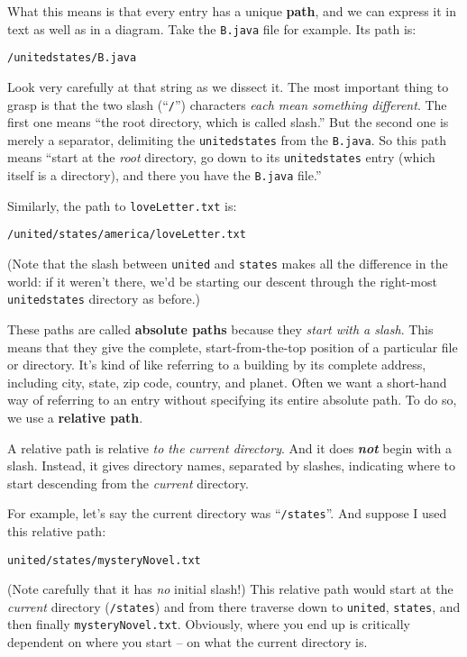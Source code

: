 What this means is that every entry has a unique \textbf{path}, and we can
express it in text as well as in a diagram. Take the \texttt{B.java} file for
example. Its path is:

\quad\quad \texttt{/unitedstates/B.java}

Look very carefully at that string as we dissect it. The most important thing
to grasp is that the two slash (``\texttt{/}'') characters \textit{each mean
something different}. The first one means ``the root directory, which is called
slash.'' But the second one is merely a separator, delimiting the
\texttt{unitedstates} from the \texttt{B.java}. So this path means
``start at the \textit{root} directory, go down to its \texttt{unitedstates}
entry (which itself is a directory), and there you have the \texttt{B.java}
file.''

Similarly, the path to \texttt{loveLetter.txt} is:

\quad\quad \texttt{/united/states/america/loveLetter.txt}

(Note that the slash between \texttt{united} and \texttt{states} makes all the
difference in the world: if it weren't there, we'd be starting our descent
through the right-most \texttt{unitedstates} directory as before.)

These paths are called \textbf{absolute paths} because they \textit{start with
a slash}. This means that they give the complete, start-from-the-top position
of a particular file or directory. It's kind of like referring to a building
by its complete address, including city, state, zip code, country, and planet.
Often we want a short-hand way of referring to an entry without specifying its
entire absolute path. To do so, we use a \textbf{relative path}.

A relative path is relative \textit{to the current directory}. And it does
\textit{\textbf{not}} begin with a slash. Instead, it gives directory names,
separated by slashes, indicating where to start descending from the
\textit{current} directory.

For example, let's say the current directory was ``\texttt{/states}''. And
suppose I used this relative path:

\quad\quad \texttt{united/states/mysteryNovel.txt}

(Note carefully that it has \textit{no} initial slash!) This relative path
would start at the \textit{current} directory (\texttt{/states}) and from there
traverse down to \texttt{united}, \texttt{states}, and then finally
\texttt{mysteryNovel.txt}. Obviously, where you end up is critically dependent
on where you start -- on what the current directory is.

